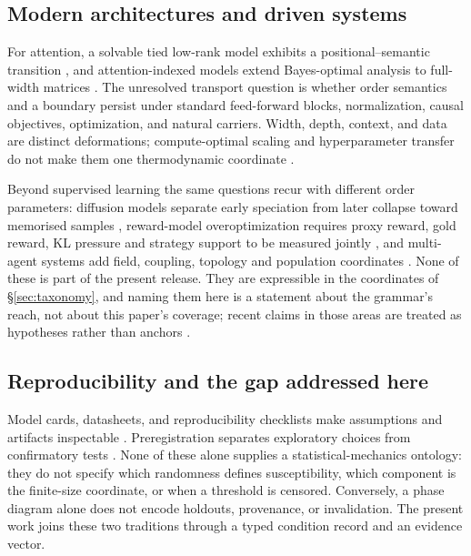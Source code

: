 \subsection{Modern architectures and driven systems}

For attention, a solvable tied low-rank model exhibits a
positional--semantic transition \cite{cui2024phase}, and attention-indexed models
extend Bayes-optimal analysis to full-width matrices
\cite{boncoraglio2026aim}. The unresolved transport question is whether order
semantics and a boundary persist under standard feed-forward blocks,
normalization, causal objectives, optimization, and natural carriers. Width,
depth, context, and data are distinct deformations; compute-optimal scaling and
hyperparameter transfer do not make them one thermodynamic coordinate
\cite{tensor_chinchilla_hoffmann2022,tensor_mup_yang2022}.

Beyond supervised learning the same questions recur with different order
parameters: diffusion models separate early speciation from later collapse
toward memorised samples \cite{biroli2024dynamical,ho2020ddpm,peebles2023dit},
reward-model overoptimization requires proxy reward, gold reward, KL pressure
and strategy support to be measured jointly
\cite{gao2023reward,rafailov2024overoptimization}, and multi-agent systems add
field, coupling, topology and population coordinates
\cite{degroot1974consensus,lowe2017maddpg,du2024debate}. None of these is part
of the present release. They are expressible in the coordinates of
\S\ref{sec:taxonomy}, and naming them here is a statement about the grammar's
reach, not about this paper's coverage; recent claims in those areas are treated
as hypotheses rather than anchors \cite{zhang2026concurrence,
denobili2026collective,bertalanic2026ringelmann}.

\subsection{Reproducibility and the gap addressed here}

Model cards, datasheets, and reproducibility checklists make assumptions and
artifacts inspectable \cite{mitchell2019modelcards,gebru2021datasheets,
pineau2021reproducibility}. Preregistration separates exploratory choices from
confirmatory tests \cite{nosek2018preregistration}. None of these alone supplies
a statistical-mechanics ontology: they do not specify which randomness defines
susceptibility, which component is the finite-size coordinate, or when a
threshold is censored. Conversely, a phase diagram alone does not encode
holdouts, provenance, or invalidation. The present work joins these two
traditions through a typed condition record and an evidence vector.

